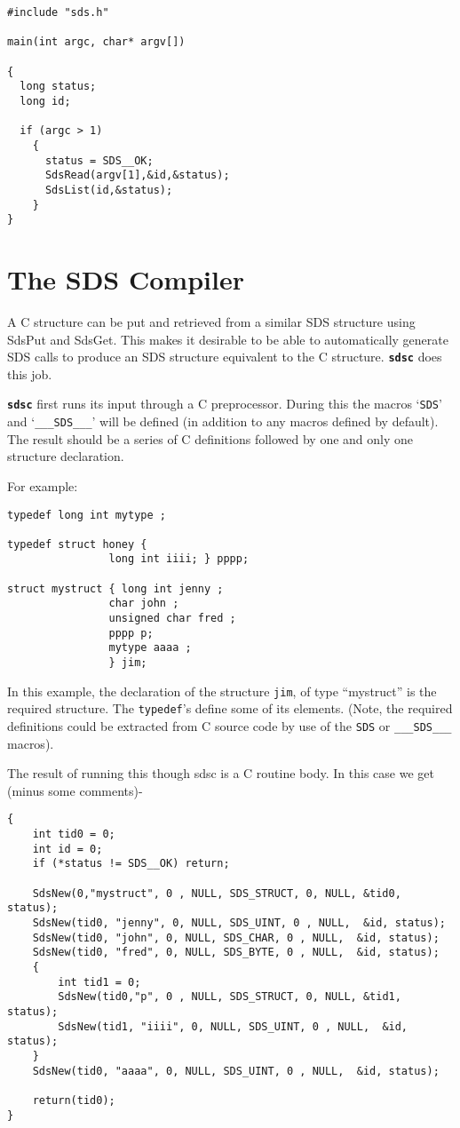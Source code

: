\begin{verbatim}
#include "sds.h"

main(int argc, char* argv[])

{
  long status;
  long id;
 
  if (argc > 1)
    {
      status = SDS__OK;
      SdsRead(argv[1],&id,&status);
      SdsList(id,&status);
    }
}
\end{verbatim}

\section{The SDS Compiler}

A C structure can be put and retrieved from a similar SDS
structure using SdsPut and SdsGet.  This makes it desirable to be
able to automatically generate SDS calls to produce an SDS
structure equivalent to the C structure.  {\bf \tt sdsc} does this job.
 
{\bf \tt sdsc} first runs its input through a C preprocessor.  During
this the macros `{\tt SDS}' and `{\tt \_\_\_SDS\_\_\_}' will be defined (in addition
to any macros defined by default).   The result should be a series
of C definitions followed by one and only one structure declaration.

For example:
\begin{verbatim}
typedef long int mytype ;

typedef struct honey { 
                long int iiii; } pppp;

struct mystruct { long int jenny ;
                char john ;
                unsigned char fred ;
                pppp p;
                mytype aaaa ;
                } jim;
\end{verbatim}

In this example, the declaration of the structure {\tt jim}, of type
``mystruct'' is the required structure.  The {\tt typedef}'s define
some of its elements.  (Note, the required definitions could be
extracted from C source code by use of the {\tt SDS} or {\tt \_\_\_SDS\_\_\_}  macros).

The result of running this though sdsc is a C routine body.  In this
case we get (minus some comments)-
\begin{verbatim}
{
    int tid0 = 0;
    int id = 0;
    if (*status != SDS__OK) return;

    SdsNew(0,"mystruct", 0 , NULL, SDS_STRUCT, 0, NULL, &tid0, status);
    SdsNew(tid0, "jenny", 0, NULL, SDS_UINT, 0 , NULL,  &id, status);
    SdsNew(tid0, "john", 0, NULL, SDS_CHAR, 0 , NULL,  &id, status);
    SdsNew(tid0, "fred", 0, NULL, SDS_BYTE, 0 , NULL,  &id, status);
    { 
        int tid1 = 0; 
        SdsNew(tid0,"p", 0 , NULL, SDS_STRUCT, 0, NULL, &tid1, status);
        SdsNew(tid1, "iiii", 0, NULL, SDS_UINT, 0 , NULL,  &id, status);
    }
    SdsNew(tid0, "aaaa", 0, NULL, SDS_UINT, 0 , NULL,  &id, status);
 
    return(tid0);
}
\end{verbatim}

